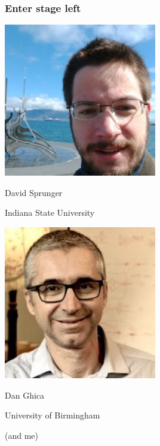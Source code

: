\begin{frame}
    \frametitle{Enter stage left}

    \centering
    \wait
    \begin{minipage}{0.49\textwidth}
        \centering
        \includegraphics[width=0.5\textwidth]{imgs/sprunger}

        David Sprunger

        \scriptsize
        Indiana State University
    \end{minipage}
    \wait
    \begin{minipage}{0.49\textwidth}
        \centering
        \includegraphics[width=0.5\textwidth]{imgs/ghica}

        Dan Ghica

        \scriptsize
        University of Birmingham
    \end{minipage}

    \wait
    \scriptsize
    (and me)
\end{frame}